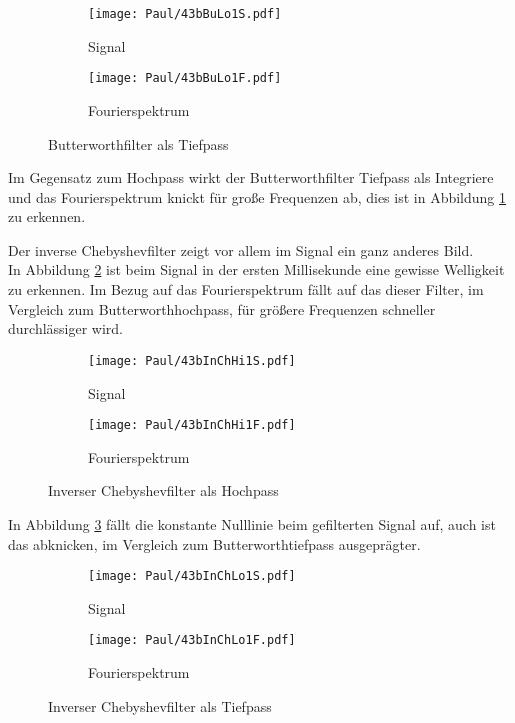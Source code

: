 \begin{figure}[h]
    \centering
    \begin{subfigure}{0.45\textwidth}
        \centering
        \texttt{[image: Paul/43bBuLo1S.pdf]}
        \caption{Signal}
    \end{subfigure}
    \hfill
    \begin{subfigure}{0.45\textwidth}
        \centering
        \texttt{[image: Paul/43bBuLo1F.pdf]}
        \caption{Fourierspektrum}
    \end{subfigure}
    \caption{Butterworthfilter als Tiefpass}
    \label{fig:43BuLo1}
\end{figure}

Im Gegensatz zum Hochpass wirkt der Butterworthfilter Tiefpass als Integriere und das Fourierspektrum knickt für große Frequenzen ab, dies ist in Abbildung \ref{fig:43BuLo1} zu erkennen.


\newpage
Der inverse Chebyshevfilter zeigt vor allem im Signal ein ganz anderes Bild.\\
In Abbildung \ref{fig:43bInChHi1} ist beim Signal in der ersten Millisekunde eine gewisse Welligkeit zu erkennen. Im Bezug auf das Fourierspektrum fällt auf das dieser Filter, im Vergleich zum Butterworthhochpass, für größere Frequenzen schneller durchlässiger wird.
\begin{figure}[h]
    \centering
    \begin{subfigure}{0.45\textwidth}
        \centering
        \texttt{[image: Paul/43bInChHi1S.pdf]}
        \caption{Signal}
    \end{subfigure}
    \hfill
    \begin{subfigure}{0.45\textwidth}
        \centering
        \texttt{[image: Paul/43bInChHi1F.pdf]}
        \caption{Fourierspektrum}
    \end{subfigure}
    \caption{Inverser Chebyshevfilter als Hochpass}
    \label{fig:43bInChHi1}
\end{figure}

In Abbildung \ref{fig:43bInChLo1} fällt die konstante Nulllinie beim gefilterten Signal auf, auch ist das abknicken, im Vergleich zum Butterworthtiefpass ausgeprägter.

\begin{figure}[h]
    \centering
    \begin{subfigure}{0.45\textwidth}
        \centering
        \texttt{[image: Paul/43bInChLo1S.pdf]}
        \caption{Signal}
    \end{subfigure}
    \hfill
    \begin{subfigure}{0.45\textwidth}
        \centering
        \texttt{[image: Paul/43bInChLo1F.pdf]}
        \caption{Fourierspektrum}
    \end{subfigure}
    \caption{Inverser Chebyshevfilter als Tiefpass}
    \label{fig:43bInChLo1}
\end{figure}

